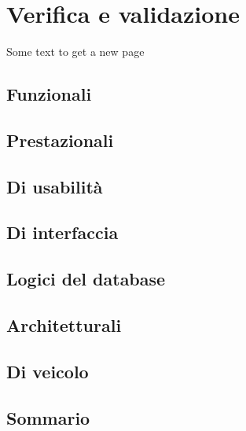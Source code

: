 \section{Verifica e validazione}

Some text to get a new page

\subsection{Funzionali}
\subsection{Prestazionali}
\subsection{Di usabilità}
\subsection{Di interfaccia}
\subsection{Logici del database}
\subsection{Architetturali}
\subsection{Di veicolo}
\subsection{Sommario}

